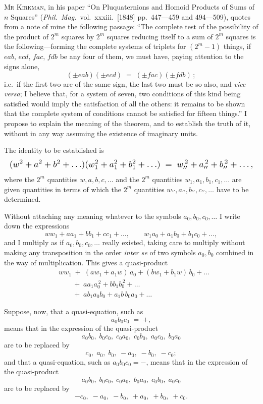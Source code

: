 \documentclass[11pt,a4paper]{article}
\theoremstyle{plain}
\begin{document}
\noindent\textsc{Mr Kirkman,} in his paper ``On Pluquaternions and Homoid Products of Sums of $n$ Squares'' (\textit{Phil.\ Mag.}\ vol.\ xxxiii.\ [1848] pp.\ 447---459 and 494---509), quotes from a note of mine the following passage: ``The complete test of the possibility of the product of $2^m$ squares by $2^m$ squares reducing itself to a sum of $2^m$ squares is the following---forming the complete systems of triplets for $(2^m - 1)$ things, if $eab$, $ecd$, $fac$, $fdb$ be any four of them, we must have, paying attention to the signs alone,
\[(\pm eab)(\pm ecd) \;=\; (\pm fac)(\pm fdb)\,;\]
i.e.\ if the first two are of the same sign, the last two must be so also, and \emph{vice versa}; I believe that, for a system of seven, two conditions of this kind being satisfied would imply the satisfaction of all the others: it remains to be shown that the complete system of conditions cannot be satisfied for fifteen things.'' I propose to explain the meaning of the theorem, and to establish the truth of it, without in any way assuming the existence of imaginary units.

The identity to be established is
\[
\resizebox{\textwidth}{!}{$\displaystyle (w^2 + a^2 + b^2 + \ldots)(w_1^2 + a_1^2 + b_1^2 + \ldots) \;=\; w_{\prime\prime}^{\,2} + a_{\prime\prime}^{\,2} + b_{\prime\prime}^{\,2} + \ldots, $}
\]
where the $2^m$ quantities $w, a, b, c, \ldots$ and the $2^m$ quantities $w_1, a_1, b_1, c_1, \ldots$ are given quantities in terms of which the $2^m$ quantities $w_{\prime\prime}, a_{\prime\prime}, b_{\prime\prime}, c_{\prime\prime}, \ldots$ have to be determined.

Without attaching any meaning whatever to the symbols $a_0, b_0, c_0, \ldots$ I write down the expressions
\[w w_1 + a a_1 + b b_1 + c c_1 + \ldots, \qquad w_1 a_0 + a_1 b_0 + b_1 c_0 + \ldots,\]
and I multiply as if $a_0, b_0, c_0, \ldots$ really existed, taking care to multiply without making any transposition in the order \emph{inter se} of two symbols $a_0, b_0$ combined in the way of multiplication. This gives a quasi-product
\begin{align*}
& w w_1 \;+\; (a w_1 + a_1 w)\, a_0 + (b w_1 + b_1 w)\, b_0 + \ldots\\
&\qquad +\; a a_1 a_0^{\,2} + b b_1 b_0^{\,2} + \ldots\\
&\qquad +\; a b_1 a_0 b_0 + a_1 b\, b_0 a_0 + \ldots
\end{align*}

Suppose, now, that a quasi-equation, such as
\[a_0 b_0 c_0 \;=\; +,\]
means that in the expression of the quasi-product
\[a_0 b_0,\; b_0 c_0,\; c_0 a_0,\; c_0 b_0,\; a_0 c_0,\; b_0 a_0\]
are to be replaced by
\[c_0,\; a_0,\; b_0,\; -a_0,\; -b_0,\; -c_0;\]
and that a quasi-equation, such as $a_0 b_0 c_0 = -$, means that in the expression of the quasi-product
\[a_0 b_0,\; b_0 c_0,\; c_0 a_0,\; b_0 a_0,\; c_0 b_0,\; a_0 c_0\]
are to be replaced by
\[-c_0,\; -a_0,\; -b_0,\; +a_0,\; +b_0,\; +c_0.\]
\end{document}
